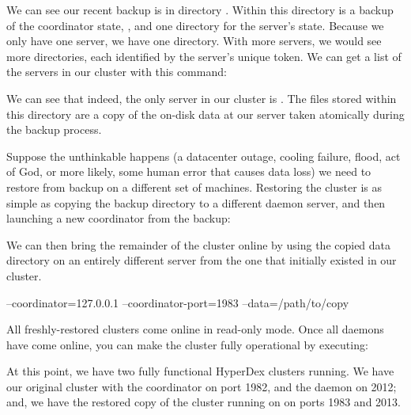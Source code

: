 We can see our recent backup is in directory .  Within
this directory is a backup of the coordinator state, , and
one directory for the server's state.  Because we only have one server, we have
one directory.  With more servers, we would see more directories, each
identified by the server's unique token.  We can get a list of the servers in
our cluster with this command:

\begin{consolecode}
\end{consolecode}

We can see that indeed, the only server in our cluster is
.  The files stored within this directory are a copy
of the on-disk data at our server taken atomically during the backup process.

Suppose the unthinkable happens (a datacenter outage, cooling failure, flood,
act of God, or more likely, some human error that causes data loss) we need to
restore from backup on a different set of machines.  Restoring the cluster is as
simple as copying the backup directory
 to a different
daemon server, and then launching a new coordinator from the backup:

\begin{consolecode}
\end{consolecode}

We can then bring the remainder of the cluster online by using the copied data
directory on an entirely different server from the one that initially existed in
our cluster.

\begin{consolecode}
                     --coordinator=127.0.0.1 --coordinator-port=1983 --data=/path/to/copy
\end{consolecode}

All freshly-restored clusters come online in read-only mode.  Once all daemons
have come online, you can make the cluster fully operational by executing:

\begin{consolecode}
\end{consolecode}

At this point, we have two fully functional HyperDex clusters running.  We have
our original cluster with the coordinator on port 1982, and the daemon on 2012;
and, we have the restored copy of the cluster running on on ports 1983 and 2013.

